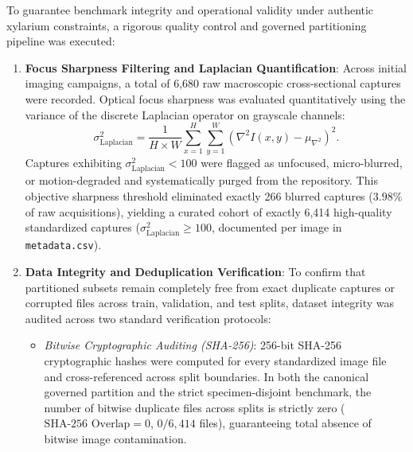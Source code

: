 \documentclass[a4paper,fleqn,12pt]{cas-sc}
\begin{document}
To guarantee benchmark integrity and operational validity under authentic xylarium constraints, a rigorous quality control and governed partitioning pipeline was executed:
\begin{enumerate}[leftmargin=*,itemsep=2pt,topsep=2pt]
    \item \textbf{Focus Sharpness Filtering and Laplacian Quantification}: Across initial imaging campaigns, a total of 6,680 raw macroscopic cross-sectional captures were recorded. Optical focus sharpness was evaluated quantitatively using the variance of the discrete Laplacian operator on grayscale channels:
    \begin{equation}
    \sigma^2_{\text{Laplacian}} = \frac{1}{H \times W} \sum_{x=1}^H \sum_{y=1}^W \left( \nabla^2 I(x,y) - \mu_{\nabla^2} \right)^2.
    \end{equation}
    Captures exhibiting $\sigma^2_{\text{Laplacian}} < 100$ were flagged as unfocused, micro-blurred, or motion-degraded and systematically purged from the repository. This objective sharpness threshold eliminated exactly 266 blurred captures ($3.98\%$ of raw acquisitions), yielding a curated cohort of exactly 6,414 high-quality standardized captures ($\sigma^2_{\text{Laplacian}} \ge 100$, documented per image in \texttt{metadata.csv}).
    \item \textbf{Data Integrity and Deduplication Verification}: To confirm that partitioned subsets remain completely free from exact duplicate captures or corrupted files across train, validation, and test splits, dataset integrity was audited across two standard verification protocols:
    \begin{itemize}[leftmargin=*,itemsep=1.5pt,topsep=1.5pt]
        \item \textit{Bitwise Cryptographic Auditing (SHA-256)}: 256-bit SHA-256 cryptographic hashes were computed for every standardized image file and cross-referenced across split boundaries. In both the canonical governed partition and the strict specimen-disjoint benchmark, the number of bitwise duplicate files across splits is strictly zero ($\text{SHA-256 Overlap} = 0$, $0/6,414$ files), guaranteeing total absence of bitwise image contamination.

\end{itemize}
\end{enumerate}
\end{document}
